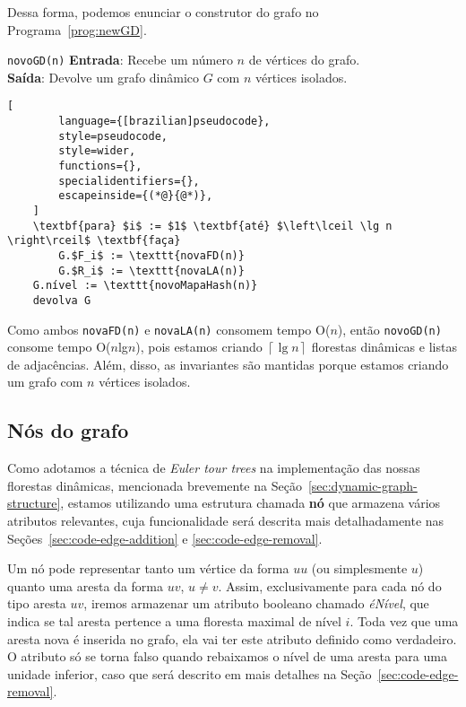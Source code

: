 Dessa forma, podemos enunciar o construtor do grafo no Programa~\ref{prog:newGD}. 

\begin{programruledcaption}{\texttt{novoGD(n)} \label{prog:newGD}}
    \noindent\textbf{Entrada}: Recebe um número $n$ de vértices do grafo. \\
    \textbf{Saída}: Devolve um grafo dinâmico $G$ com $n$ vértices isolados.
    \vspace{-0.5\baselineskip}
    \begin{lstlisting}[
        language={[brazilian]pseudocode},
        style=pseudocode,
        style=wider,
        functions={},
        specialidentifiers={},
        escapeinside={(*@}{@*)},
    ]
    \textbf{para} $i$ := $1$ \textbf{até} $\left\lceil \lg n \right\rceil$ \textbf{faça}
        G.$F_i$ := \texttt{novaFD(n)}
        G.$R_i$ := \texttt{novaLA(n)}
    G.nível := \texttt{novoMapaHash(n)}
    devolva G
    \end{lstlisting}
    \vspace{-0.5\baselineskip}
\end{programruledcaption}

Como ambos \texttt{novaFD(n)} e \texttt{novaLA(n)} consomem tempo O($n$), então \texttt{novoGD(n)} consome tempo O($n$lg$n$), pois estamos criando $\left\lceil \lg n \right\rceil$ florestas dinâmicas e listas de adjacências. Além, disso, as invariantes são mantidas porque estamos criando um grafo com $n$ vértices isolados.

\subsection{Nós do grafo}
\label{sec:graph-nodes}

Como adotamos a técnica de \textit{Euler tour trees} na implementação das nossas florestas dinâmicas, mencionada brevemente na Seção~\ref{sec:dynamic-graph-structure}, estamos utilizando uma estrutura chamada \textbf{nó} que armazena vários atributos relevantes, cuja funcionalidade será descrita mais detalhadamente nas Seções~\ref{sec:code-edge-addition} e \ref{sec:code-edge-removal}. 

Um nó pode representar tanto um vértice da forma $uu$ (ou simplesmente $u$) quanto uma aresta da forma $uv$, $u \neq v$. Assim, exclusivamente para cada nó do tipo aresta $uv$, iremos armazenar um atributo booleano chamado \textit{éNível}, que indica se tal aresta pertence a uma floresta maximal de nível $i$. Toda vez que uma aresta nova é inserida no grafo, ela vai ter este atributo definido como verdadeiro. O atributo só se torna falso quando rebaixamos o nível de uma aresta para uma unidade inferior, caso que será descrito em mais detalhes na Seção~\ref{sec:code-edge-removal}. 

